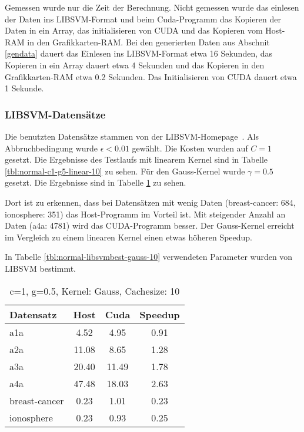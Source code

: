 \documentclass[ngerman]{scrartcl}
\begin{document}
Gemessen wurde nur die Zeit der Berechnung.
Nicht gemessen wurde das einlesen der Daten ins LIBSVM-Format und beim Cuda-Programm das Kopieren der Daten 
in ein Array, das initialisieren von CUDA und das Kopieren vom Host-RAM in den Grafikkarten-RAM.
Bei den generierten Daten aus Abschnit \ref{gendata} dauert das Einlesen ins LIBSVM-Format etwa 16 Sekunden, das Kopieren in ein Array
dauert etwa 4 Sekunden und das Kopieren in den Grafikkarten-RAM etwa 0.2 Sekunden. Das Initialisieren von CUDA dauert etwa 1 Sekunde.


\subsubsection{LIBSVM-Datensätze}
Die benutzten Datensätze stammen von der LIBSVM-Homepage~\cite{libsvm-data}. Als Abbruchbedingung wurde $\epsilon < 0.01$ gewählt. Die Kosten wurden auf $C=1$ gesetzt. Die Ergebnisse des Testlaufs mit linearem Kernel sind in Tabelle \ref{tbl:normal-c1-g5-linear-10} zu sehen. Für den Gauss-Kernel wurde $\gamma=0.5$ gesetzt. Die Ergebnisse sind in Tabelle \ref{tbl:normal-c1-g5-gauss-10} zu sehen.

Dort ist zu erkennen, dass bei Datensätzen mit wenig Daten (breast-cancer: 684, ionosphere: 351) das Host-Programm im Vorteil ist. Mit steigender Anzahl an Daten (a4a: 4781) wird das CUDA-Programm besser.
Der Gauss-Kernel erreicht im Vergleich zu einem linearen Kernel einen etwas höheren Speedup.

In Tabelle \ref{tbl:normal-libsvmbest-gauss-10} verwendeten Parameter wurden von LIBSVM bestimmt.

\begin{table}
\begin{center}
\begin{tabular}{|l|c|c|c|}
\hline
Datensatz & Host & Cuda & Speedup \\
\hline
a1a & 4.52 & 4.95 & 0.91 \\
a2a & 11.08 & 8.65 & 1.28 \\
a3a & 20.40 & 11.49 & 1.78 \\
a4a & 47.48 & 18.03 & 2.63 \\
breast-cancer & 0.23 & 1.01 & 0.23 \\
ionosphere & 0.23 & 0.93 & 0.25 \\
\hline
\end{tabular}
\end{center}
\caption{ c=1, g=0.5, Kernel: Gauss, Cachesize: 10}
\label{tbl:normal-c1-g5-gauss-10}
\end{table}
\end{document}
